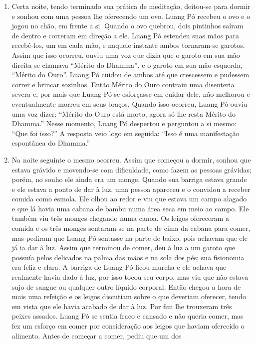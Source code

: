 \begin{enumerate}
\item
  Certa noite, tendo terminado sua prática de meditação, deitou-se para
  dormir e sonhou com uma pessoa lhe oferecendo um ovo. Luang Pó recebeu
  o ovo e o jogou no chão, em frente a si. Quando o ovo quebrou, dois
  pintinhos saíram de dentro e correram em direção a ele. Luang Pó
  estendeu suas mãos para recebê-los, um em cada mão, e naquele instante
  ambos tornaram-se garotos. Assim que isso ocorreu, ouviu uma voz que
  dizia que o garoto em sua mão direita se chamava ``Mérito do Dhamma'',
  e o garoto em sua mão esquerda, ``Mérito do Ouro''. Luang Pó cuidou de
  ambos até que crescessem e pudessem correr e brincar sozinhos. Então
  Mérito do Ouro contraiu uma disenteria severa e, por mais que Luang Pó
  se esforçasse em cuidar dele, não melhorou e eventualmente morreu em
  seus braços. Quando isso ocorreu, Luang Pó ouviu uma voz dizer:
  ``Mérito do Ouro está morto, agora só lhe resta Mérito do Dhamma.''
  Nesse momento, Luang Pó despertou e perguntou a si mesmo: ``Que foi
  isso?'' A resposta veio logo em seguida: ``Isso é uma manifestação
  espontânea do Dhamma.''
\item
  Na noite seguinte o mesmo ocorreu. Assim que começou a dormir, sonhou
  que estava grávido e movendo-se com dificuldade, como fazem as pessoas
  grávidas; porém, no sonho ele ainda era um monge. Quando sua barriga
  estava grande e ele estava a ponto de dar à luz, uma pessoa apareceu e
  o convidou a receber comida como esmola. Ele olhou ao redor e viu que
  estava um campo alagado e que lá havia uma cabana de bambu numa área
  seca em meio ao campo. Ele também viu três monges chegando numa canoa.
  Os leigos ofereceram a comida e os três monges sentaram-se na parte de
  cima da cabana para comer, mas pediram que Luang Pó sentasse na parte
  de baixo, pois achavam que ele já ia dar à luz. Assim que terminou de
  comer, deu à luz a um garoto que possuía pelos delicados na palma das
  mãos e na sola dos pés; sua fisionomia era feliz e clara. A barriga de
  Luang Pó ficou murcha e ele achava que realmente havia dado à luz, por
  isso tocou seu corpo, mas viu que não estava sujo de sangue ou
  qualquer outro líquido corporal. Então chegou a hora de mais uma
  refeição e os leigos discutiam sobre o que deveriam oferecer, tendo em
  vista que ele havia acabado de dar à luz. Por fim lhe trouxeram três
  peixes assados. Luang Pó se sentia fraco e cansado e não queria comer,
  mas fez um esforço em comer por consideração aos leigos que haviam
  oferecido o alimento. Antes de começar a comer, pediu que um dos

\end{enumerate}
